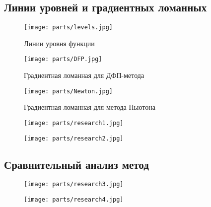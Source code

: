 \documentclass[../body.tex]{subfiles}
\begin{document}
\subsection{Линии уровней и градиентных ломанных}
\begin{figure}[H]
    \centering
    \texttt{[image: parts/levels.jpg]}
    \caption{Линии уровня функции}
\end{figure}

\begin{figure}[H]
    \centering
    \texttt{[image: parts/DFP.jpg]}
    \caption{Градиентная ломанная для ДФП-метода}
\end{figure}

\begin{figure}[H]
    \centering
    \texttt{[image: parts/Newton.jpg]}
    \caption{Градиентная ломанная для метода Ньютона}
\end{figure}

\begin{figure}[H]
    \centering
    \texttt{[image: parts/research1.jpg]}
\end{figure}

\begin{figure}[H]
    \centering
    \texttt{[image: parts/research2.jpg]}
\end{figure}

\subsection{Сравнительный анализ метод}
\begin{figure}[H]
    \centering
    \texttt{[image: parts/research3.jpg]}
\end{figure}

\begin{figure}[H]
    \centering
    \texttt{[image: parts/research4.jpg]}
\end{figure}
\end{document}
